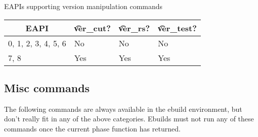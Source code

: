 \begin{centertable}{EAPIs supporting version manipulation commands}
    \label{tab:version-commands}
    \begin{tabular}{llll}
      \toprule
      \multicolumn{1}{c}{\textbf{EAPI}} &
      \multicolumn{1}{c}{\textbf{\t{ver_cut}?}} &
      \multicolumn{1}{c}{\textbf{\t{ver_rs}?}} &
      \multicolumn{1}{c}{\textbf{\t{ver_test}?}} \\
      \midrule
      0, 1, 2, 3, 4, 5, 6 & No  & No  & No  \\
      7, 8                & Yes & Yes & Yes \\
      \bottomrule
    \end{tabular}
\end{centertable}

\subsection{Misc commands}
The following commands are always available in the ebuild environment, but don't really fit in any
of the above categories. Ebuilds must not run any of these commands once the current phase function
has returned.

